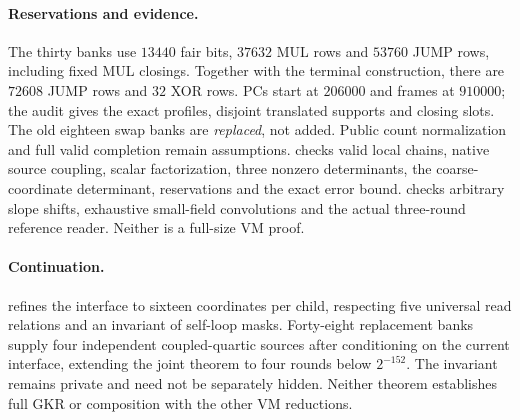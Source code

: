 \documentclass[11pt]{article}
\begin{document}
\paragraph{Reservations and evidence.} The thirty banks use $13440$ fair bits, $37632$ MUL rows and $53760$ JUMP rows, including fixed MUL closings. Together with the terminal construction, there are $72608$ JUMP rows and $32$ XOR rows. PCs start at $206000$ and frames at $910000$; the audit gives the exact profiles, disjoint translated supports and closing slots. The old eighteen swap banks are \emph{replaced}, not added. Public count normalization and full valid completion remain assumptions.  checks valid local chains, native source coupling, scalar factorization, three nonzero determinants, the coarse-coordinate determinant, reservations and the exact error bound.  checks arbitrary slope shifts, exhaustive small-field convolutions and the actual three-round reference reader. Neither is a full-size VM proof.

\paragraph{Continuation.}  refines the interface to sixteen coordinates per child, respecting five universal read relations and an invariant of self-loop masks. Forty-eight replacement banks supply four independent coupled-quartic sources after conditioning on the current interface, extending the joint theorem to four rounds below $2^{-152}$. The invariant remains private and need not be separately hidden. Neither theorem establishes full GKR or composition with the other VM reductions.
\end{document}
